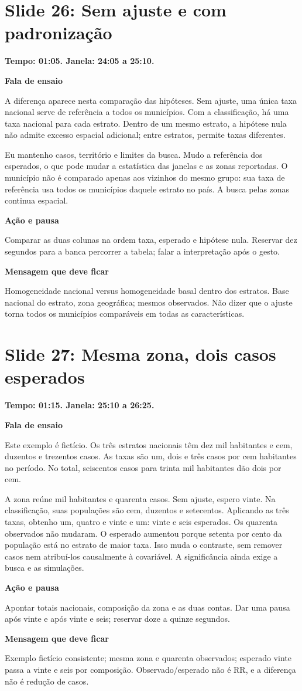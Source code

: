 \documentclass[11pt,a4paper]{article}
\newcommand{\bloco}[1]{\par\Needspace{3\baselineskip}\textbf{#1}\par}
\newcommand{\slide}[2]{\Needspace{13\baselineskip}\section*{Slide #1: #2}}
\begin{document}
\par\begin{minipage}{\textwidth}
\slide{26}{Sem ajuste e com padronização}
{\color{azul}\textbf{Tempo: 01:05. Janela: 24:05 a 25:10.}}\par
\bloco{Fala de ensaio}
A diferença aparece nesta comparação das hipóteses. Sem ajuste, uma única taxa nacional serve de referência a todos os municípios. Com a classificação, há uma taxa nacional para cada estrato. Dentro de um mesmo estrato, a hipótese nula não admite excesso espacial adicional; entre estratos, permite taxas diferentes.

Eu mantenho casos, território e limites da busca. Mudo a referência dos esperados, o que pode mudar a estatística das janelas e as zonas reportadas. O município não é comparado apenas aos vizinhos do mesmo grupo: sua taxa de referência usa todos os municípios daquele estrato no país. A busca pelas zonas continua espacial.
\bloco{Ação e pausa}
Comparar as duas colunas na ordem taxa, esperado e hipótese nula. Reservar dez segundos para a banca percorrer a tabela; falar a interpretação após o gesto.
\bloco{Mensagem que deve ficar}
Homogeneidade nacional versus homogeneidade basal dentro dos estratos. Base nacional do estrato, zona geográfica; mesmos observados. Não dizer que o ajuste torna todos os municípios comparáveis em todas as características.
\end{minipage}\par\bigskip
\par\begin{minipage}{\textwidth}
\slide{27}{Mesma zona, dois casos esperados}
{\color{azul}\textbf{Tempo: 01:15. Janela: 25:10 a 26:25.}}\par
\bloco{Fala de ensaio}
Este exemplo é fictício. Os três estratos nacionais têm dez mil habitantes e cem, duzentos e trezentos casos. As taxas são um, dois e três casos por cem habitantes no período. No total, seiscentos casos para trinta mil habitantes dão dois por cem.

A zona reúne mil habitantes e quarenta casos. Sem ajuste, espero vinte. Na classificação, suas populações são cem, duzentos e setecentos. Aplicando as três taxas, obtenho um, quatro e vinte e um: vinte e seis esperados. Os quarenta observados não mudaram. O esperado aumentou porque setenta por cento da população está no estrato de maior taxa. Isso muda o contraste, sem remover casos nem atribuí-los causalmente à covariável. A significância ainda exige a busca e as simulações.
\bloco{Ação e pausa}
Apontar totais nacionais, composição da zona e as duas contas. Dar uma pausa após vinte e após vinte e seis; reservar doze a quinze segundos.
\bloco{Mensagem que deve ficar}
Exemplo fictício consistente; mesma zona e quarenta observados; esperado vinte passa a vinte e seis por composição. Observado/esperado não é RR, e a diferença não é redução de casos.
\end{minipage}\par\bigskip
\end{document}
